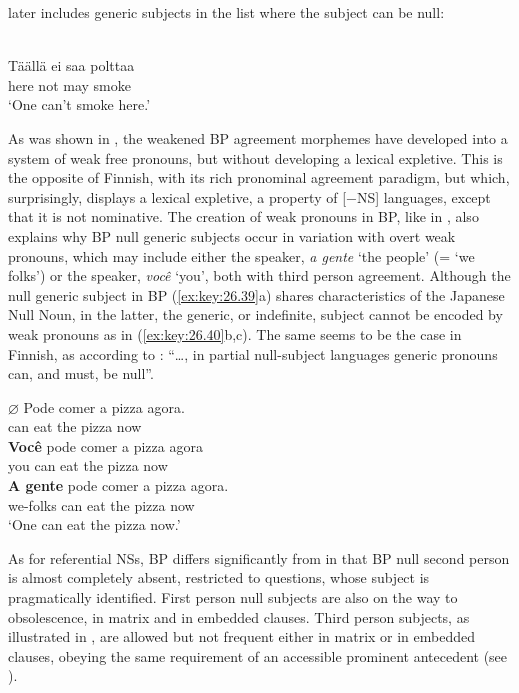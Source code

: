 \documentclass[output=paper]{langsci/langscibook}
\begin{document}
\citet{Holmberg2005} later includes generic subjects in the list where the
subject can be null:

\ea%
\label{ex:key:26.39}\\
	\gll	Täällä  ei saa polttaa\\
			here   not may smoke\\
	\glt	\enquote*{One can't smoke here.}
\z

As was shown in , the weakened \gls{BP} agreement morphemes have developed into a system of weak free
pronouns, but without developing a lexical expletive. This is the opposite of
Finnish, with its rich pronominal agreement paradigm, but which, surprisingly,
displays a lexical expletive, a property of [−NS] languages, except that it is
not nominative.   The creation of weak pronouns in \gls{BP}, like in , also explains why \gls{BP} null generic subjects occur in variation with overt weak pronouns,
which may include either the speaker, \emph{a gente} \enquote*{the people} (=
\enquote*{we folks}) or the speaker, \emph{você} \enquote*{you}, both with
third person agreement.  Although the null generic subject in
\gls{BP} (\ref{ex:key:26.39}a) shares characteristics of
the Japanese Null Noun, in the latter, the generic, or indefinite, subject
cannot be encoded by weak pronouns as in (\ref{ex:key:26.40}b,c).  The same
seems to be the case in Finnish, as according to \citet[540]{Holmberg2005}:
“\dots, in partial null-subject languages generic pronouns can, and must, be
null”.

\ea%
    \label{ex:key:26.40}
    \ea
	\gll	\textbf{$\varnothing$}  Pode comer a pizza agora.\\
    {} can eat     the pizza now\\
    \ex
	\gll	\textbf{Você} pode comer a pizza agora\\
			you can     eat the pizza  now\\
    \ex
	\gll	\textbf{A gente} pode comer a pizza agora.\\
			we-folks can eat      the pizza now\\
	\glt	\enquote*{One can eat the pizza now.}
    \z
\z

As for referential NSs, \gls{BP} differs significantly
from  in that \gls{BP} null second person is
almost completely absent, restricted to questions, whose subject is
pragmatically identified. First person null subjects are also on the way to
obsolescence, in matrix and in embedded clauses. Third person subjects, as
illustrated in , are allowed but not frequent either in
matrix or in embedded clauses, obeying the same requirement of an accessible
prominent antecedent (see \citealt{KatoDuarte2014a,KatoDuarte2014b}).
\end{document}
